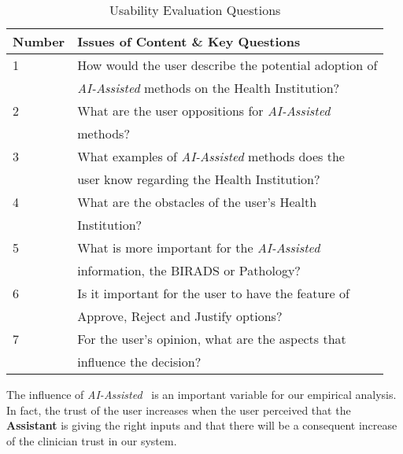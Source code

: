 \begin{table}[h]
\centering
\begin{tabular}{l|l}
Number & Issues of Content \& Key Questions                    	 \\ \hline
1      & How would the user describe the potential adoption of   \\
       & \textit{AI-Assisted} methods on the Health Institution? \\ \hline
2      & What are the user oppositions for \textit{AI-Assisted}	 \\
       & methods?                                                \\ \hline
3      & What examples of \textit{AI-Assisted} methods does the  \\
       & user know regarding the Health Institution?             \\ \hline
4      & What are the obstacles of the user's Health             \\
       & Institution?                                            \\ \hline
5      & What is more important for the \textit{AI-Assisted}     \\
       & information, the BIRADS or Pathology?                   \\ \hline
6      & Is it important for the user to have the feature of		 \\
       & Approve, Reject and Justify options?                    \\ \hline
7      & For the user's opinion, what are the aspects that       \\
       & influence the decision?                                 \\ \hline

\end{tabular}
\caption{Usability Evaluation Questions}
\label{table:usability_evaluation_questions}
\end{table}

\hfill

The influence of \textit{AI-Assisted}~\cite{goodfellow2016deep} is an important variable for our empirical analysis. In fact, the trust of the user increases when the user perceived that the \textbf{Assistant} is giving the right inputs and that there will be a consequent increase of the clinician trust in our system.

\clearpage

